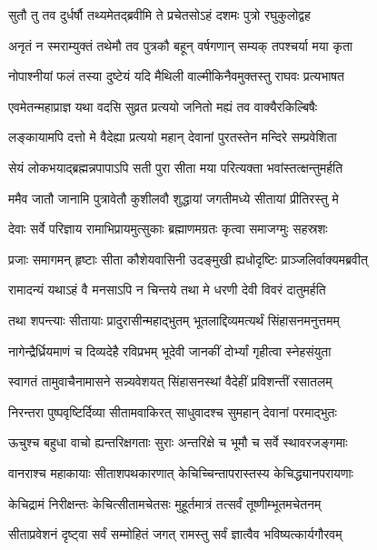 \twolineshloka
{सुतौ तु तव दुर्धर्षौ तथ्यमेतद्ब्रवीमि ते}
{प्रचेतसोऽहं दशमः पुत्रो रघुकुलोद्वह} %

\twolineshloka
{अनृतं न स्मराम्युक्तं तथेमौ तव पुत्रकौ}
{बहून् वर्षगणान् सम्यक् तपश्चर्या मया कृता} %

\twolineshloka
{नोपाश्नीयां फलं तस्या दुष्टेयं यदि मैथिली}
{वाल्मीकिनैवमुक्तस्तु राघवः प्रत्यभाषत} %

\twolineshloka
{एवमेतन्महाप्राज्ञ यथा वदसि सुव्रत}
{प्रत्ययो जनितो मह्यं तव वाक्यैरकिल्बिषैः} %

\twolineshloka
{लङ्कायामपि दत्तो मे वैदेह्या प्रत्ययो महान्}
{देवानां पुरतस्तेन मन्दिरे सम्प्रवेशिता} %

\twolineshloka
{सेयं लोकभयाद्ब्रह्मन्नपापाऽपि सती पुरा}
{सीता मया परित्यक्ता भवांस्तत्क्षन्तुमर्हति} %

\twolineshloka
{ममैव जातौ जानामि पुत्रावेतौ कुशीलवौ}
{शुद्धायां जगतीमध्ये सीतायां प्रीतिरस्तु मे} %

\twolineshloka
{देवाः सर्वे परिज्ञाय रामाभिप्रायमुत्सुकाः}
{ब्रह्माणमग्रतः कृत्वा समाजग्मुः सहस्रशः} %

\twolineshloka
{प्रजाः समागमन् हृष्टाः सीता कौशेयवासिनी}
{उदङ्मुखी ह्यधोदृष्टिः प्राञ्जलिर्वाक्यमब्रवीत्} %

\twolineshloka
{रामादन्यं यथाऽहं वै मनसाऽपि न चिन्तये}
{तथा मे धरणी देवी विवरं दातुमर्हति} %

\twolineshloka
{तथा शपन्त्याः सीतायाः प्रादुरासीन्महाद्भुतम्}
{भूतलाद्दिव्यमत्यर्थं सिंहासनमनुत्तमम्} %

\twolineshloka
{नागेन्द्रैर्ध्रियमाणं च दिव्यदेहै रविप्रभम्}
{भूदेवी जानकीं दोर्भ्यां गृहीत्वा स्नेहसंयुता} %

\twolineshloka
{स्वागतं तामुवाचैनामासने सन्न्यवेशयत्}
{सिंहासनस्थां वैदेहीं प्रविशन्तीं रसातलम्} %

\twolineshloka
{निरन्तरा पुष्पवृष्टिर्दिव्या सीतामवाकिरत्}
{साधुवादश्च सुमहान् देवानां परमाद्भुतः} %

\twolineshloka
{ऊचुश्च बहुधा वाचो ह्यन्तरिक्षगताः सुराः}
{अन्तरिक्षे च भूमौ च सर्वे स्थावरजङ्गमाः} %

\twolineshloka
{वानराश्च महाकायाः सीताशपथकारणात्}
{केचिच्चिन्तापरास्तस्य केचिद्ध्यानपरायणाः} %

\twolineshloka
{केचिद्रामं निरीक्षन्तः केचित्सीतामचेतसः}
{मुहूर्तमात्रं तत्सर्वं तूष्णीम्भूतमचेतनम्} %

\twolineshloka
{सीताप्रवेशनं दृष्ट्वा सर्वं सम्मोहितं जगत्}
{रामस्तु सर्वं ज्ञात्वैव भविष्यत्कार्यगौरवम्} %

